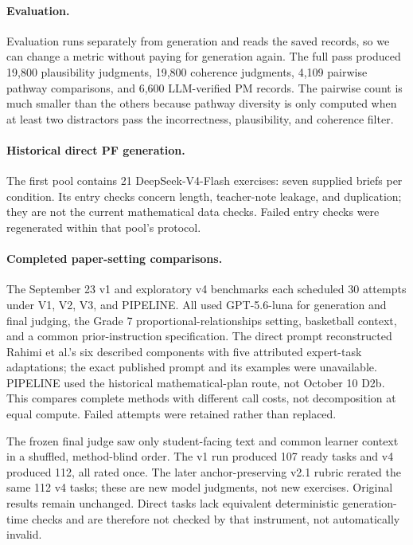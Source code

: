 \paragraph{Evaluation.} Evaluation runs separately from generation and reads the saved records, so we can change a metric without paying for generation again. The full pass produced 19{,}800 plausibility judgments, 19{,}800 coherence judgments, 4{,}109 pairwise pathway comparisons, and 6{,}600 LLM-verified PM records. The pairwise count is much smaller than the others because pathway diversity is only computed when at least two distractors pass the incorrectness, plausibility, and coherence filter.

\paragraph{Historical direct PF generation.} The first pool contains 21 DeepSeek-V4-Flash exercises: seven supplied briefs per condition. Its entry checks concern length, teacher-note leakage, and duplication; they are not the current mathematical data checks. Failed entry checks were regenerated within that pool's protocol.

\paragraph{Completed paper-setting comparisons.} The September 23 v1 and exploratory v4 benchmarks each scheduled 30 attempts under V1, V2, V3, and PIPELINE. All used GPT-5.6-luna for generation and final judging, the Grade 7 proportional-relationships setting, basketball context, and a common prior-instruction specification. The direct prompt reconstructed Rahimi et al.'s six described components with five attributed expert-task adaptations; the exact published prompt and its examples were unavailable. PIPELINE used the historical mathematical-plan route, not October 10 D2b. This compares complete methods with different call costs, not decomposition at equal compute. Failed attempts were retained rather than replaced.

The frozen final judge saw only student-facing text and common learner context in a shuffled, method-blind order. The v1 run produced 107 ready tasks and v4 produced 112, all rated once. The later anchor-preserving v2.1 rubric rerated the same 112 v4 tasks; these are new model judgments, not new exercises. Original results remain unchanged. Direct tasks lack equivalent deterministic generation-time checks and are therefore not checked by that instrument, not automatically invalid.

